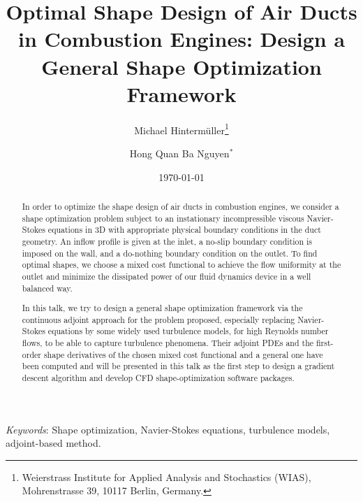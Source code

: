 \documentclass[oneside]{article}
\title{Optimal Shape Design of Air Ducts in Combustion Engines: Design a General Shape Optimization Framework}
\author{Michael Hinterm\"uller\thanks{Weierstrass Institute for Applied Analysis and Stochastics (WIAS), Mohrenstrasse 39, 10117 Berlin, Germany.} \and Hong Quan Ba Nguyen${}^*$}
\date{\today}
\begin{document}
\maketitle
\thispagestyle{empty}
\begin{abstract}
    In order to optimize the shape design of air ducts in combustion engines, we consider a shape optimization problem subject to an instationary incompressible viscous Navier-Stokes equations in 3D with appropriate physical boundary conditions in the duct geometry. An inflow profile is given at the inlet, a no-slip boundary condition is imposed on the wall, and a do-nothing boundary condition on the outlet. To find optimal shapes, we choose a mixed cost functional to achieve the flow uniformity at the outlet and minimize the dissipated power of our fluid dynamics device in a well balanced way.
    
    In this talk, we try to design a general shape optimization framework via the continuous adjoint approach for the problem proposed, especially replacing Navier-Stokes equations by some widely used turbulence models, for high Reynolds number flows, to be able to capture turbulence phenomena. Their adjoint PDEs and the first-order shape derivatives of the chosen mixed cost functional and a general one have been computed and will be presented in this talk as the first step to design a gradient descent algorithm and develop CFD shape-optimization software packages.
\end{abstract}
\textit{Keywords}: Shape optimization, Navier-Stokes equations, turbulence models, adjoint-based method.
\end{document}
